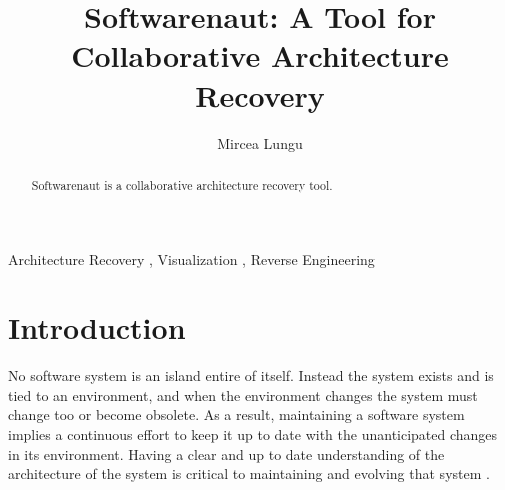 \documentclass[preprint,12pt]{elsarticle}
\begin{document}
\begin{frontmatter}



\title{Softwarenaut: A Tool for Collaborative Architecture Recovery}


\author{Mircea Lungu}

\address{Software Composition Group\\University of Bern\\Switzerland}

\begin{abstract}
Softwarenaut is a collaborative architecture recovery tool.
\end{abstract}

\begin{keyword}
Architecture Recovery \sep
Visualization \sep
Reverse Engineering
\end{keyword}

\end{frontmatter}


\section{Introduction}
\label{sec:Introduction}

No software system is an island entire of itself. Instead the system exists and is tied to an environment, and when the environment changes the system must change too or become obsolete\cite{lehman-softev}. As a result, maintaining a software system implies a continuous effort to keep it up to date with the unanticipated changes in its environment. Having a clear and up to date understanding of the architecture of the system is critical to maintaining and evolving that system \cite{Duca09c}.
\end{document}
